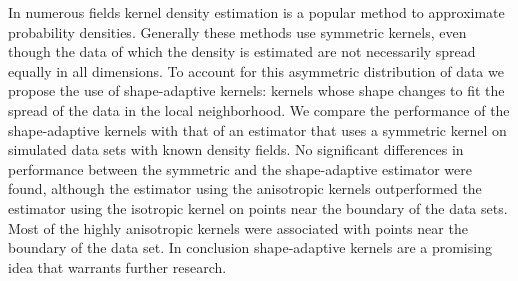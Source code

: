 \noindent In numerous fields kernel density estimation is a popular method to approximate probability densities.
Generally these methods use symmetric kernels, even though the data of which the density is estimated are not necessarily spread equally in all dimensions. To account for this asymmetric distribution of data we propose the use of shape-adaptive kernels: kernels whose shape changes to fit the spread of the data in the local neighborhood.
We compare the performance of the shape-adaptive kernels with that of an estimator that uses a symmetric kernel on simulated data sets with known density fields.
No significant differences in performance between the symmetric and the shape-adaptive estimator were found, although the estimator using the anisotropic kernels outperformed the estimator using the isotropic kernel on points near the boundary of the data sets. Most of the highly anisotropic kernels were associated with points near the boundary of the data set.
In conclusion shape-adaptive kernels are a promising idea that warrants further research.
